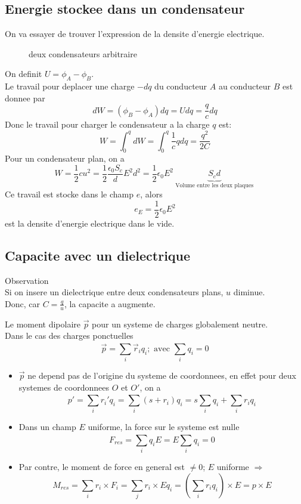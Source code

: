 \documentclass[../main.tex]{subfiles}
\begin{document}
\subsection{Energie stockee dans un condensateur}
On va essayer de trouver l'expression de la densite d'energie electrique.
\begin{figure}[H]
    \centering
    \caption{deux condensateurs arbitraire}
    \label{fig:condensateur-arbitraire}
\end{figure}
On definit $U = \phi_A - \phi_B$.\\
Le travail pour deplacer une charge $-dq$ du conducteur $A$ au conducteur $B$ est donnee par
\[ 
	dW = ( \phi _B - \phi_A) dq = U dq = \frac{q}{c}dq
\]
Donc le travail pour charger le condensateur a la charge $q$ est:
\[ 
W = \int_{ 0 }^{ q }dW = \int_{ 0 }^{ q } \frac{1}{c} q dq = \frac{q^{2}}{2 C}
\]
Pour un condensateur plan, on a
\[ 
W= \frac{1}{2} c u^{2} = \frac{1}{2} \frac{\epsilon_0 S_c}{d}E^{2} d^{2}= \frac{1}{2} \epsilon_0 E^{2} \underbrace{S_c d}_{ \text{ Volume entre les deux plaques } }
\]
Ce travail est stocke dans le champ $e$, alors
\[ 
e_E = \frac{1}{2}\epsilon_0 E^{2}
\]
est la densite d'energie electrique dans le vide.
\subsection{Capacite avec un dielectrique }
Observation\\
Si on insere un dielectrique entre deux condensateurs plans, $u$ diminue.\\
Donc, car $C= \frac{q}{u}$, la capacite a augmente.
\begin{defn}
	Le moment dipolaire $\vec{p}$ pour un systeme de charges globalement neutre.\\
Dans le cas des charges ponctuelles
\[ 
\vec{p}= \sum_{i}^{ } \vec{r}_i q_i; \text{ avec } \sum_{i}^{ }q_i =0
\]


\end{defn}
\begin{itemize}
\item $\vec{p}$ ne depend pas de l'origine du systeme de coordonnees, en effet pour deux systemes de coordonnees $O$ et $O'$, on a
	\[ 
		p' = \sum_{i}^{ }r_i' q_i = \sum_{i}^{ }( s+ r_i) q_i  = s \sum_{i}^{ }q_i + \sum_{i}^{ }r_i q_i
	\]
	
\item Dans un champ $E$ uniforme, la force sur le systeme est nulle
	\[ 
	F_{ res } = \sum_{i}^{ }q_i E = E \sum_{i}^{ }q_i =0
	\]

\item Par contre, le moment de force en general est $\neq 0$; $E$ uniforme $ \Rightarrow $
	\[ 
	M_{res} = \sum_{i}^{ }r_i \times F_i = \sum_{j}^{ }r_i \times E q_i = ( \sum_{i}^{ }r_i q_i  )\times E = p \times E
	\]
	
\end{itemize}
			
\end{document}
